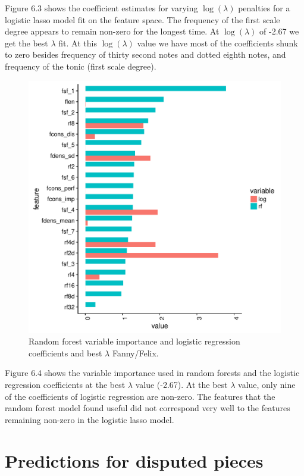 \documentclass[12pt,twoside]{reedthesis}
\theoremstyle{definition}
\theoremstyle{definition}
\theoremstyle{definition}
\theoremstyle{remark}
\begin{document}
Figure 6.3 shows the coefficient estimates for varying \(\log(\lambda)\)
penalties for a logistic lasso model fit on the feature space. The
frequency of the first scale degree appears to remain non-zero for the
longest time. At \(\log(\lambda)\) of -2.67 we get the best \(\lambda\)
fit. At this \(\log(\lambda)\) value we have most of the coefficients
shunk to zero besides frequency of thirty second notes and dotted eighth
notes, and frequency of the tonic (first scale degree).
\begin{figure}[H]
\centering
\includegraphics[scale = .5]{images/var_imp_rflog_f.pdf}
\caption{Random forest variable importance and logistic regression coefficients and best $\lambda$ Fanny/Felix.}
\label{subd}
\end{figure}
Figure 6.4 shows the variable importance used in random forests and the
logistic regression coefficients at the best \(\lambda\) value (-2.67).
At the best \(\lambda\) value, only nine of the coefficients of logistic
regression are non-zero. The features that the random forest model found
useful did not correspond very well to the features remaining non-zero
in the logistic lasso model.

\section{Predictions for disputed
pieces}\label{predictions-for-disputed-pieces}
\end{document}
